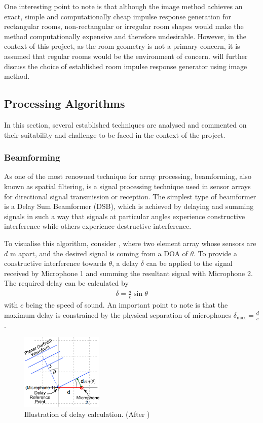\documentclass[a4paper,twoside,12pt,hidelinks]{article}
\begin{document}
One interesting point to note is that although the image method achieves an exact, simple and computationally cheap impulse response generation for rectangular rooms, non-rectangular or irregular room shapes would make the method computationally expensive and therefore undesirable. However, in the context of this project, as the room geometry is not a primary concern, it is assumed that regular rooms would be the environment of concern.  will further discuss the choice of established room impulse response generator using image method.

\subsection{Processing Algorithms}
In this section, several established techniques are analysed and commented on their suitability and challenge to be faced in the context of the project.
\subsubsection{Beamforming}
\label{sect:beamformingreview}
As one of the most renowned technique for array processing, beamforming, also known as spatial filtering, is a signal processing technique used in sensor arrays for directional signal transmission or reception. The simplest type of beamformer is a Delay Sum Beamformer (DSB), which is achieved by delaying and summing signals in such a way that signals at particular angles experience constructive interference while others experience destructive interference. 

To visualise this algorithm, consider , where two element array whose sensors are $d$ m apart, and the desired signal is coming from a DOA of $\theta$. To provide a constructive interference towards $\theta$, a delay $\delta$ can be applied to the signal received by Microphone 1 and summing the resultant signal with Microphone 2. The required delay can be calculated by 
\begin{align}
\delta = \frac{d}{c} \sin\theta \label{eq:delay}
\end{align}
with $c$ being the speed of sound. An important point to note is that the maximum delay is constrained by the physical separation of microphones $\delta_\text{max}=\frac{d}{c}$. 

\begin{figure}[H]
\centering
\includegraphics[width=0.35\textwidth]{trigDelay1D}
\caption{Illustration of delay calculation. (After \cite{TheLabBookPagesDelayCalculation})}
\label{fig:delay}
\end{figure}
\end{document}
